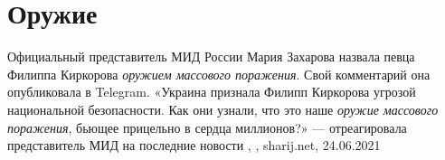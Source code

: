  
 
 
 
 
\chapter{Оружие}
\label{sec:slova.oruzhie}

Официальный представитель МИД России Мария Захарова назвала певца Филиппа
Киркорова \emph{оружием массового поражения}. Свой комментарий она опубликовала в
Telegram.  «Украина признала Филипп Киркорова угрозой национальной
безопасности. Как они узнали, что это наше \emph{оружие массового поражения}, бьющее
прицельно в сердца миллионов?» — отреагировала представитель МИД на последние
новости
, , sharij.net, 24.06.2021
